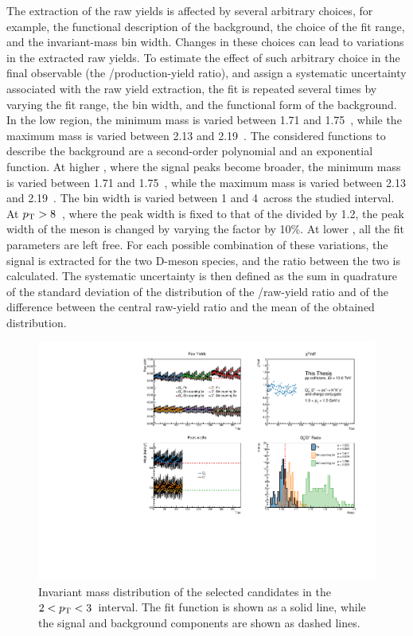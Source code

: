 The extraction of the raw yields is affected by several arbitrary choices, for example, the functional description of the background, the choice of the fit range, and the invariant-mass bin width. Changes in these choices can lead to variations in the extracted raw yields. To estimate the effect of such arbitrary choice in the final observable (the \ds/\dpl production-yield ratio), and assign a systematic uncertainty associated with the raw yield extraction, the fit is repeated several times by varying the fit range, the bin width, and the functional form of the background. In the low \pt region, the minimum mass is varied between 1.71 and 1.75~\gevcc, while the maximum mass is varied between 2.13 and 2.19~\gevcc. The considered functions to describe the background are a second-order polynomial and an exponential function. At higher \pt, where the signal peaks become broader, the minimum mass is varied between 1.71 and 1.75~\gevcc, while the maximum mass is varied between 2.13 and 2.19~\gevcc. The bin width is varied between 1 and 4~\mevcc across the studied \pt interval. At $p_\mathrm{T}>8$~\gevcc, where the \dpl peak width is fixed to that of the \ds divided by 1.2, the peak width of the \dpl meson is changed by varying the factor by 10\%. At lower \pt, all the fit parameters are left free. For each possible combination of these variations, the signal is extracted for the two D-meson species, and the ratio between the two is calculated. The systematic uncertainty is then defined as the sum in quadrature of the standard deviation of the distribution of the \ds/\dpl raw-yield ratio and of the difference between the central raw-yield ratio and the mean of the obtained distribution.

\begin{figure}[htb]
    \centering
    \includegraphics[width=\textwidth]{Figures/Chapter 5/RawYieldSyst.pdf}
    \caption{Invariant mass distribution of the selected candidates in the $2<p_\mathrm{T}<3$~\gevc interval. The fit function is shown as a solid line, while the signal and background components are shown as dashed lines.}
    \label{fig:raw_yield_syst}
\end{figure}

